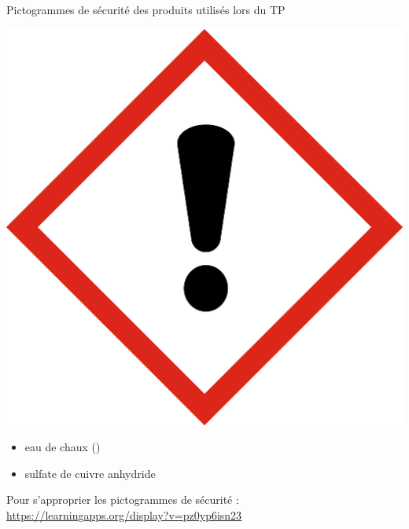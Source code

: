 \begin{doc}{Pictogrammes de sécurité des produits utilisés lors du TP}
\begin{minipage}{0.5\linewidth}
    \end{minipage}
    \begin{minipage}{0.5\linewidth}\vspace{-1.8cm}
    \begin{center}
        \includegraphics[scale=0.3]{Images/Fiche_Methode1/SGH07_PointExclamation.jpg}
    \end{center}
    \begin{itemize}
            \item eau de chaux ()
            \item sulfate de cuivre anhydride 
    \end{itemize}
    \end{minipage}
    \vspace{1cm}
    
    \begin{large}
    \end{large}Pour s'approprier les pictogrammes de sécurité : \url{https://learningapps.org/display?v=pz0yp6isn23} 
\end{doc}

